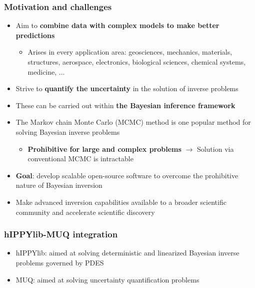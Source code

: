 \documentclass{beamer}
\begin{document}
\begin{frame}[c]
  \frametitle{Motivation and challenges}

  \begin{itemize}
    \item Aim to {\bf combine data with complex models to make better predictions}
      \begin{itemize}
        \item Arises in every application area: geosciences, mechanics,
          materials, structures, aerospace, electronics, biological sciences,
          chemical systems, medicine, ...
      \end{itemize}
    \item Strive to {\bf quantify the uncertainty} in the solution of inverse
      problems
    \item These can be carried out within {\bf the Bayesian inference framework}
    \item The Markov chain Monte Carlo (MCMC) method is one popular method for
      solving Bayesian inverse problems
      \begin{itemize}
        \item {\bf Prohibitive for large and complex problems} $\rightarrow$ Solution
          via conventional MCMC is intractable
      \end{itemize}
    \item {\bf Goal}: develop scalable open-source software to overcome the
      prohibitive nature of Bayesian inversion
    \item Make advanced inversion capabilities available to a broader
      scientific community and accelerate scientific discovery
  \end{itemize}

\end{frame}

\begin{frame}[c]
  \frametitle{hIPPYlib-MUQ integration}
   \begin{center}
    
  \end{center}

  \begin{itemize}
    \item hIPPYlib: aimed at solving deterministic and linearized Bayesian
      inverse problems governed by PDES
    \item MUQ: aimed at solving uncertainty quantification problems
  \end{itemize}
\end{frame}
\end{document}
